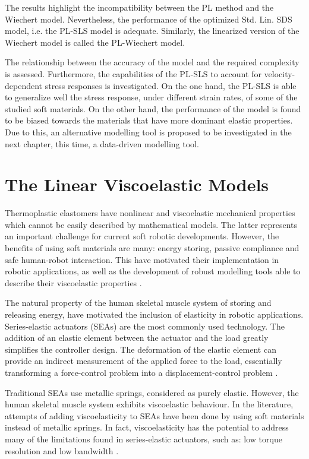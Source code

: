 The results highlight the incompatibility between the PL method and the Wiechert model. Nevertheless, the performance of the optimized Std. Lin. SDS model, i.e. the PL-SLS model is adequate. Similarly, the linearized version of the Wiechert model is called the PL-Wiechert model.

The relationship between the accuracy of the model and the required complexity is assessed. Furthermore, the capabilities of the PL-SLS to account for velocity-dependent stress responses is investigated. On the one hand, the PL-SLS is able to generalize well the stress response, under different strain rates, of some of the studied soft materials. On the other hand, the performance of the model is found to be biased towards the materials that have more dominant elastic properties. Due to this, an alternative modelling tool is proposed to be investigated in the next chapter, this time, a data-driven modelling tool.

\section{The Linear Viscoelastic Models}

Thermoplastic elastomers have nonlinear and viscoelastic mechanical properties which cannot be easily described by mathematical models. The latter represents an important challenge for current soft robotic developments. However, the benefits of using soft materials are many: energy storing, passive compliance and safe human-robot interaction. This have motivated their implementation in robotic applications, as well as the development of robust modelling tools able to describe their viscoelastic properties \cite{lee2017soft}.

The natural property of the human skeletal muscle system of storing and releasing energy, have motivated the inclusion of elasticity in robotic applications. Series-elastic actuators (SEAs) are the most commonly used technology. The addition of an elastic element between the actuator and the load greatly simplifies the controller design. The deformation of the elastic element can provide an indirect measurement of the applied force to the load, essentially transforming a force-control problem into a displacement-control problem \cite{agarwal2017series}. 

Traditional SEAs use metallic springs, considered as purely elastic. However, the human skeletal muscle system exhibits viscoelastic behaviour. In the literature, attempts of adding viscoelasticity to SEAs have been done by using soft materials instead of metallic springs. In fact, viscoelasticity has the potential to address many of the limitations found in series-elastic actuators, such as: low torque resolution and low bandwidth \cite{martins2015polyurethane,tagliamonte2014rendering,schepelmann2014compact}. 

